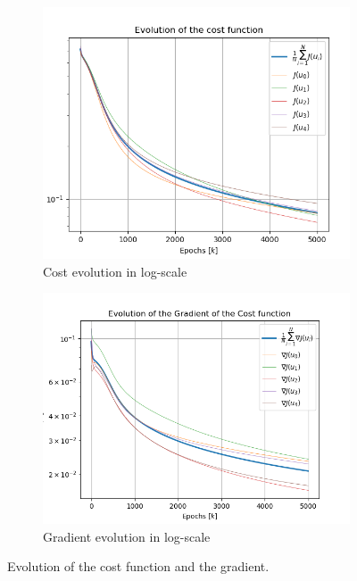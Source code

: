 \documentclass[a4paper,11pt,oneside]{book}
\begin{document}
\begin{figure}[h]
\centering
	\begin{subfigure}{0.49\textwidth}	
	\includegraphics[width=\textwidth]{cycle/cost_log}
	\caption{Cost evolution in log-scale}
	\end{subfigure}
\hfill
	\begin{subfigure}{0.49\textwidth}	
	\includegraphics[width=1.08\textwidth]{cycle/gradient_log}
	\caption{Gradient evolution in log-scale}
	\end{subfigure}
\caption{Evolution of the cost function and the gradient.}
\label{cycle_cost_grad}
\end{figure}
\end{document}
